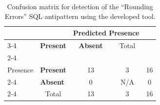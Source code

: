 \begin{table}[H]
    \centering
    \caption{Confusion matrix for detection of the “Rounding Errors” SQL antipattern using the developed tool.}
    \label{tab:roundingErrorsConfusion}
    \begin{tabular}{l|l|c|c|c}
        \multicolumn{2}{c}{}&\multicolumn{2}{c}{Predicted Presence}&\\
        \cline{3-4}
        \multicolumn{2}{c|}{}&\textbf{Present}&\textbf{Absent}&\multicolumn{1}{c}{Total}\\
        \cline{2-4}
        \multirow{2}{1.5cm}{Actual\\Presence}& \textbf{Present} & 13 & 3 & 16\\
        \cline{2-4}
        & \textbf{Absent} & 0 & N/A & 0\\
        \cline{2-4}
        \multicolumn{1}{c}{} & \multicolumn{1}{c}{Total} & \multicolumn{1}{c}{13} & \multicolumn{1}{c}{3} & \multicolumn{1}{c}{16}\\
    \end{tabular}
\end{table}
